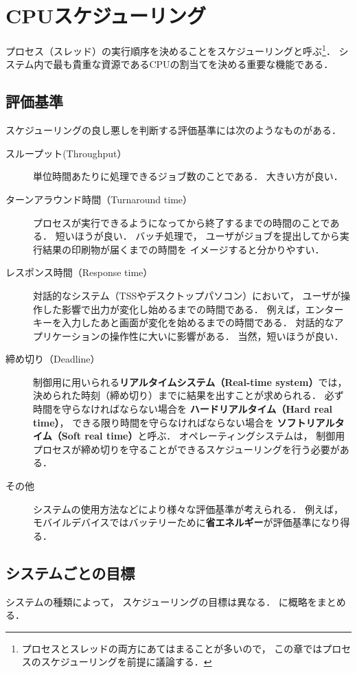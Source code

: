 \chapter{CPUスケジューリング}
プロセス（スレッド）の実行順序を決めることをスケジューリングと呼ぶ\footnote{
プロセスとスレッドの両方にあてはまることが多いので，
この章ではプロセスのスケジューリングを前提に議論する．}．
システム内で最も貴重な資源であるCPUの割当てを決める重要な機能である．

\section{評価基準}
スケジューリングの良し悪しを判断する評価基準には次のようなものがある．

\begin{description}
\item[スループット(Throughput）]
単位時間あたりに処理できるジョブ数のことである．
大きい方が良い．

\item[ターンアラウンド時間（Turnaround time）]
プロセスが実行できるようになってから終了するまでの時間のことである．
短いほうが良い．
バッチ処理で，
ユーザがジョブを提出してから実行結果の印刷物が届くまでの時間を
イメージすると分かりやすい．

\item[レスポンス時間（Response time）]
対話的なシステム（TSSやデスクトップパソコン）において，
ユーザが操作した影響で出力が変化し始めるまでの時間である．
例えば，エンターキーを入力したあと画面が変化を始めるまでの時間である．
対話的なアプリケーションの操作性に大いに影響がある．
当然，短いほうが良い．

\item[締め切り（Deadline）]
制御用に用いられる{\bf リアルタイムシステム（Real-time system）}では，
決められた時刻（締め切り）までに結果を出すことが求められる．
必ず時間を守らなければならない場合を
{\bf ハードリアルタイム（Hard real time）}，
できる限り時間を守らなければならない場合を
{\bf ソフトリアルタイム（Soft real time）}と呼ぶ．
オペレーティングシステムは，
制御用プロセスが締め切りを守ることができるスケジューリングを行う必要がある．

\item[その他]
システムの使用方法などにより様々な評価基準が考えられる．
例えば，
モバイルデバイスではバッテリーために{\bf 省エネルギー}が評価基準になり得る．
\end{description}

\section{システムごとの目標}
システムの種類によって，
スケジューリングの目標は異なる．
に概略をまとめる．

